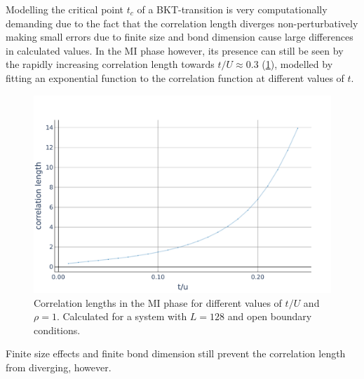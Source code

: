 \documentclass[twoside,twocolumn,9pt]{article}
\begin{document}
Modelling the critical point $t_c$ of a BKT-transition is very computationally demanding due to the fact that the correlation length diverges non-perturbatively making small errors due to finite size and bond dimension cause large differences in calculated values. In the MI phase however, its presence can still be seen by the rapidly increasing correlation length towards $t/U\approx 0.3$ (\cref{fig:cor lengths}), modelled by fitting an exponential function to the correlation function at different values of $t$. 
\begin{center}
  \begin{figure}
      \includegraphics[width=\linewidth]{../code/figures/Correlations-length-values.pdf}
      \caption{Correlation lengths in the MI phase for different values of $t/U$ and $\rho=1$. Calculated for a system with $L=128$ and open boundary conditions.}
      \label{fig:cor lengths}
  \end{figure}
\end{center}
Finite size effects and finite bond dimension still prevent the correlation length from diverging, however. 
\end{document}
